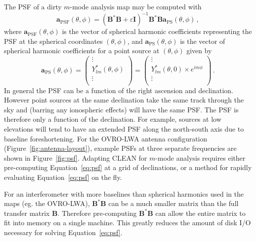 \documentclass[twocolumn]{aastex61}
\renewcommand{\b}{\pmb}
\begin{document}
The PSF of a dirty $m$-mode analysis map may be computed with
\begin{equation}\label{eq:psf}
    \b a_\text{PSF}(\theta, \phi)
        = (\b B^*\b B + \varepsilon\b I)^{-1}\b B^*\b B\b a_\text{PS}(\theta, \phi)\,,
\end{equation}
where $\b a_\text{PSF}(\theta, \phi)$ is the vector of spherical harmonic coefficients representing
the PSF at the spherical coordinates $(\theta, \phi)$, and $\b a_\text{PS}(\theta, \phi)$ is the
vector of spherical harmonic coefficients for a point source at $(\theta, \phi)$ given by
\begin{equation}
    \b a_\text{PS}(\theta, \phi) = \begin{pmatrix}
        \vdots \\
        Y_{lm}^*(\theta, \phi) \\
        \vdots \\
    \end{pmatrix}
    = \begin{pmatrix}
        \vdots \\
        Y_{lm}^*(\theta, 0)\times e^{im\phi} \\
        \vdots \\
    \end{pmatrix} \,.
\end{equation}
In general the PSF can be a function of the right ascension and declination. However point sources
at the same declination take the same track through the sky and (barring any ionospheric effects)
will have the same PSF. The PSF is therefore only a function of the declination. For example,
sources at low elevations will tend to have an extended PSF along the north-south axis due to
baseline foreshortening. For the OVRO-LWA antenna configuration (Figure~\ref{fig:antenna-layout}),
example PSFs at three separate frequencies are shown in Figure~\ref{fig:psf}.  Adapting CLEAN for
$m$-mode analysis requires either pre-computing Equation~\ref{eq:psf} at a grid of declinations, or
a method for rapidly evaluating Equation~\ref{eq:psf} on the fly.

For an interferometer with more baselines than spherical harmonics used in the maps (eg. the
OVRO-LWA), $\b B^*\b B$ can be a much smaller matrix than the full transfer matrix $\b B$. Therefore
pre-computing $\b B^*\b B$ can allow the entire matrix to fit into memory on a single machine. This
greatly reduces the amount of disk I/O necessary for solving Equation~\ref{eq:psf}.
\end{document}
